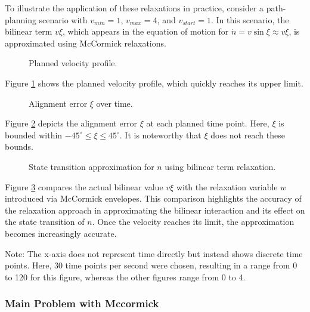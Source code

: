 To illustrate the application of these relaxations in practice, consider a path-planning scenario with \( v_{min} = 1 \), \( v_{max} = 4 \), and \(
v_{start} = 1 \).
In this scenario, the bilinear term \( v\xi \), which appears in the equation of motion for \(\dot{n} = v \sin{\xi} \approx v\xi\), is approximated
using McCormick relaxations.

\begin{figure}[h]
	\centering
	\resizebox{1\textwidth}{!}{}
	\caption{Planned velocity profile.}
	\label{fig:velocity}
\end{figure}

Figure \ref{fig:velocity} shows the planned velocity profile, which quickly reaches its upper limit.

\begin{figure}[h]
	\centering
	\resizebox{1\textwidth}{!}{}
	\caption{Alignment error \(\xi\) over time.}
	\label{fig:alignment-error}
\end{figure}

Figure \ref{fig:alignment-error} depicts the alignment error \( \xi \) at each planned time point.
Here, \( \xi \) is bounded within \(-45^{\circ} \leq \xi \leq 45^{\circ} \).
It is noteworthy that \( \xi \) does not reach these bounds.

\begin{figure}[h]
	\centering
	\resizebox{0.7\textwidth}{!}{}
	\caption{State transition approximation for \( n \) using bilinear term relaxation.}
	\label{fig:dn-term-approx}
\end{figure}

Figure \ref{fig:dn-term-approx} compares the actual bilinear value \( v\xi \) with the relaxation variable \( w \) introduced via McCormick
envelopes.
This comparison highlights the accuracy of the relaxation approach in approximating the bilinear interaction and its effect on the state transition
of \( n \).
Once the velocity reaches its limit, the approximation becomes increasingly accurate.

Note: The x-axis does not represent time directly but instead shows discrete time points.
Here, 30 time points per second were chosen, resulting in a range from 0 to 120 for this figure, whereas the other figures range from 0 to 4.

\subsubsection{Main Problem with Mccormick}

